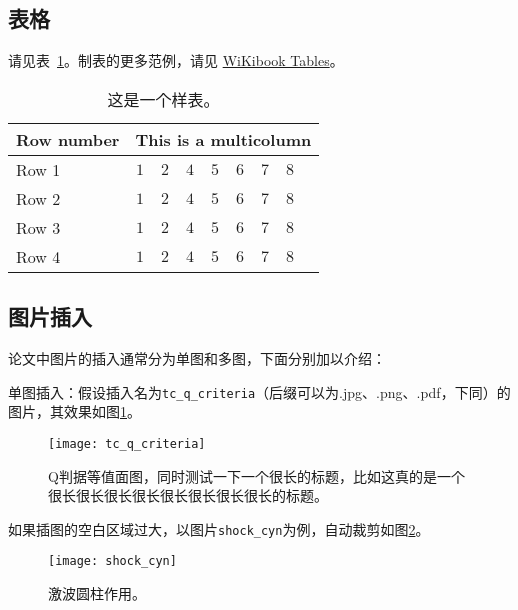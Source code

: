 \subsection{表格}

请见表~\ref{tab:sample}。制表的更多范例，请见 \href{https://en.wikibooks.org/wiki/LaTeX/Tables}{WiKibook Tables}。
\begin{table}[!htbp]
    \caption{这是一个样表。}
    \label{tab:sample}
    \centering
    \footnotesize%
    \setlength{\tabcolsep}{4pt}%
    \renewcommand{\arraystretch}{1.2}%
    \begin{tabular}{lcccccccc}
        \hline
        Row number & \multicolumn{8}{c}{This is a multicolumn} \\
        \hline
        Row 1 & $1$ & $2$ & $4$ & $5$ & $6$ & $7$ & $8$\\
        Row 2 & $1$ & $2$ & $4$ & $5$ & $6$ & $7$ & $8$\\
        Row 3 & $1$ & $2$ & $4$ & $5$ & $6$ & $7$ & $8$\\
        Row 4 & $1$ & $2$ & $4$ & $5$ & $6$ & $7$ & $8$\\
        \hline
    \end{tabular}
\end{table}

\subsection{图片插入}

论文中图片的插入通常分为单图和多图，下面分别加以介绍：

单图插入：假设插入名为\verb|tc_q_criteria|（后缀可以为.jpg、.png、.pdf，下同）的图片，其效果如图\ref{fig:tc_q_criteria}。
\begin{figure}[!htbp]
    \centering
    \texttt{[image: tc\_q\_criteria]}
    \caption{Q判据等值面图，同时测试一下一个很长的标题，比如这真的是一个很长很长很长很长很长很长很长很长的标题。}
    \label{fig:tc_q_criteria}
\end{figure}

如果插图的空白区域过大，以图片\verb|shock_cyn|为例，自动裁剪如图\ref{fig:shock_cyn}。
\begin{figure}[!htbp]
    \centering
    \texttt{[image: shock\_cyn]}
    \caption{激波圆柱作用。}
    \label{fig:shock_cyn}
\end{figure}

